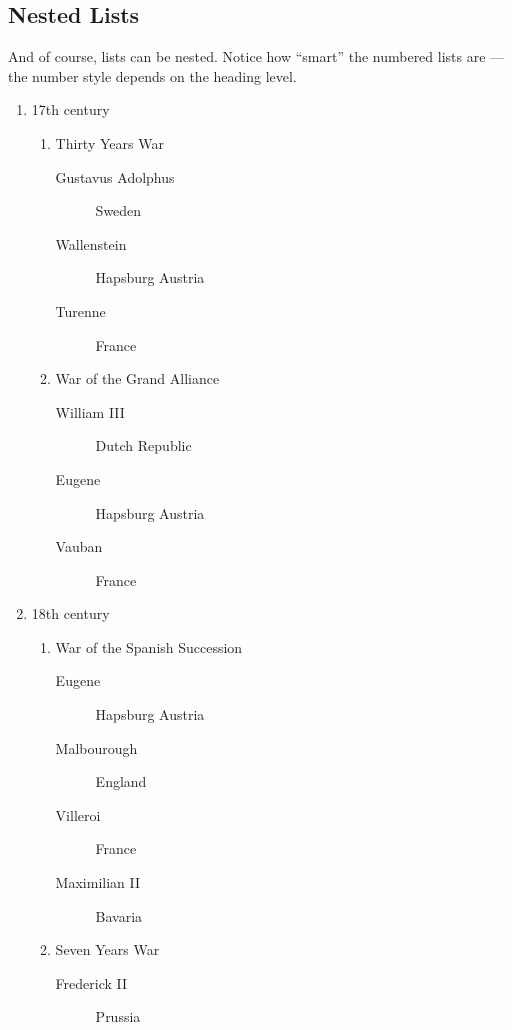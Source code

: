         \subsection{Nested Lists}
        \label{Nested Lists}

        And of course, \Lx{} lists can be nested. Notice how ``smart'' the numbered lists are --- the number style depends on the heading level.

    \begin{enumerate}
    \label{lists:nested}
        \item{17th century}
        \begin{enumerate}
            \item{Thirty Years War}
            \begin{description}
                \item[Gustavus Adolphus]{Sweden}
                \item[Wallenstein]{Hapsburg Austria}
                \item[Turenne]{France}
            \end{description}
        \item{War of the Grand Alliance}
            \begin{description}
                \item[William III]{Dutch Republic}
                \item[Eugene]{Hapsburg Austria}
                \item[Vauban]{France}
            \end{description}
        \end{enumerate}
        \item{18th century}
        \begin{enumerate}
            \item{War of the Spanish Succession}
            \begin{description}
                \item[Eugene]{Hapsburg Austria}
                \item[Malbourough]{England}
                \item[Villeroi]{France}
                \item[Maximilian II]{Bavaria}
            \end{description}
            \item{Seven Years War}
            \begin{description}
                \item[Frederick II]{Prussia}

\end{description}
\end{enumerate}
\end{enumerate}
